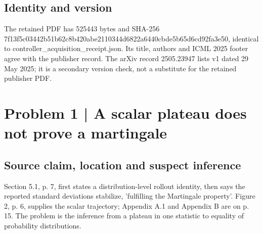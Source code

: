 \documentclass[10pt]{article}
\begin{document}
\subsection*{Identity and version}
The retained PDF has 525443 bytes and SHA-256 7f13f5c03442b51b62c8b420abe2110344d6822a6440cbde5b65d6cd92fa3e50, identical to controller\_acquisition\_receipt.json. Its title, authors and ICML 2025 footer agree with the publisher record. The arXiv record 2505.23947 lists v1 dated 29 May 2025; it is a secondary version check, not a substitute for the retained publisher PDF.\par
\section*{Problem 1 | A scalar plateau does not prove a martingale}
\subsection*{Source claim, location and suspect inference}
Section 5.1, p. 7, first states a distribution-level rollout identity, then says the reported standard deviations stabilize, ’fulfilling the Martingale property’. Figure 2, p. 6, supplies the scalar trajectory; Appendix A.1 and Appendix B are on p. 15. The problem is the inference from a plateau in one statistic to equality of probability distributions.\par
\end{document}
